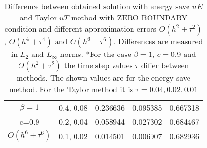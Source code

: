 \documentclass{article}
\begin{document}
\begin{table}[ht]
\begin{tabular}{||c|l|l|l|l||}
    \hline
  $\beta=1$                   & 0.4, 0.08        & 0.236636  & 0.095385  & 0.667318 \\
      c=0.9                       & 0.2, 0.04        & 0.058944   & 0.027302  &0.684467   \\
     $O(h^6+ \tau^6)$   & 0.1, 0.02    & 0.014501   & 0.006907    & 0.682936   \\
	   \hline
			\hline 
		\end{tabular}
		\caption{Difference between obtained solution with energy save $uE$ and Taylor $uT$ method with ZERO BOUNDARY condition and different approximation errors $O(h^{2} + \tau^2 )$, $O(h^{4} + \tau^4 )$ and $O(h^{6} + \tau^6 )$. Differences are measured in $L_2$ and $L_\infty$ norms. *For the case  $\beta=1$, $c=0.9$ and $O(h^2+ \tau^2)$ the time step values $\tau$ differ between methods. The shown values are for the energy save method. For the Taylor method it is $\tau = 0.04, 0.02, 0.01 $}
\label{tableB}
\end{table}
\end{document}
